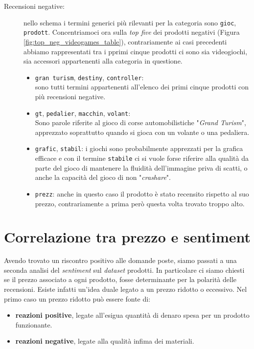 \begin{description}
				\item[Recensioni negative:] 
				nello schema i termini generici più rilevanti per la categoria sono \verb|gioc|, \verb|prodott|. Concentriamoci ora sulla \textit{top five} dei prodotti negativi (Figura \ref{fig:top_neg_videogames_table}), contrariamente ai casi precedenti abbiamo rappresentati tra i pprimi cinque prodotti ci sono sia videogiochi, sia accessori appartenenti alla categoria in questione.
				\begin{itemize}
					\item \texttt{gran turism}, \texttt{destiny}, \texttt{controller}: \\
					sono tutti termini appartenenti all'elenco dei primi cinque prodotti con più recensioni negative. 
					\item \texttt{gt}, \texttt{pedalier}, \texttt{macchin}, \texttt{volant}: \\
					Sono parole riferite al gioco di corse automobilistiche "\textit{Grand Turism}", apprezzato soprattutto quando si gioca con un volante o una pedaliera. 
					\item \texttt{grafic}, \texttt{stabil}: 
					i giochi sono probabilmente apprezzati per la grafica efficace e con il termine \verb|stabile| ci si vuole forse riferire alla qualità da parte del gioco di  mantenere la fluidità dell'immagine priva di scatti, o anche la capacità del gioco di non "\textit{crashare}".
					\item \texttt{prezz}: 
					anche in questo caso il prodotto è stato recensito rispetto al suo prezzo, contrariamente a prima però questa volta trovato troppo alto.
				\end{itemize}
			\end{description}
			
	\section{Correlazione tra prezzo e sentiment}
		Avendo trovato un riscontro positivo alle domande poste, siamo passati a una seconda analisi del \textit{sentiment} sul \textit{dataset} prodotti. In particolare ci siamo chiesti se il prezzo associato a ogni prodotto, fosse determinante per la polarità delle recensioni. Esiste infatti un'idea duale legato a un prezzo ridotto o eccessivo. Nel primo caso un prezzo ridotto può essere fonte di:
		
		\begin{itemize}
			\item \textbf{reazioni positive}, legate all'esigua quantità di denaro spesa per un prodotto funzionante.
			\item \textbf{reazioni negative}, legate alla qualità infima dei materiali.
		\end{itemize}
	

